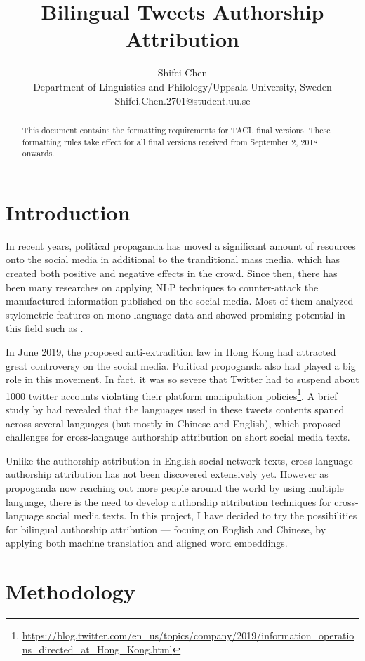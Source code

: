\documentclass[11pt,a4paper]{article}
\title{Bilingual Tweets Authorship Attribution}
\author{
 Shifei Chen \\
 Department of Linguistics and Philology/Uppsala University, Sweden \\
  {\sf Shifei.Chen.2701@student.uu.se} \\
}
\date{}
\newcommand{\taclpaper}{final version\xspace}
\newcommand{\taclpapers}{final versions\xspace}
\newcommand{\taclpaper}{submission\xspace}
\newcommand{\taclpapers}{{\taclpaper}s\xspace}
\begin{document}
\maketitle
\begin{abstract}
  This document contains the formatting requirements for TACL \taclpapers. These
  formatting rules take effect for all \taclpapers received from September 2, 2018
  onwards.
\end{abstract}

\section{Introduction}
In recent years, political propaganda has moved a significant amount of resources onto the social media in additional to the tranditional mass media, which has created both positive and negative effects in the crowd. Since then, there has been many researches on applying NLP techniques to counter-attack the manufactured information published on the social media. Most of them analyzed stylometric features on mono-language data and showed promising potential in this field such as \citet{rocha2016authorship}.

In June 2019, the proposed anti-extradition law in Hong Kong had attracted great controversy on the social media. Political propoganda also had played a big role in this movement. In fact, it was so severe that Twitter had to suspend about 1000 twitter accounts violating their platform manipulation policies\footnote{\url{https://blog.twitter.com/en_us/topics/company/2019/information_operations_directed_at_Hong_Kong.html}}. A brief study by \citet{wood_mcminn_feng_2019} had revealed that the languages used in these tweets contents spaned across several languages (but mostly in Chinese and English), which proposed challenges for cross-langauge authorship attribution on short social media texts.

Unlike the authorship attribution in English social network texts, cross-language authorship attribution has not been discovered extensively yet. However as propoganda now reaching out more people around the world by using multiple language, there is the need to develop authorship attribution techniques for cross-language social media texts. In this project, I have decided to try the possibilities for bilingual authorship attribution --- focuing on English and Chinese, by applying both machine translation and aligned word embeddings. 

\section{Methodology}
\end{document}
